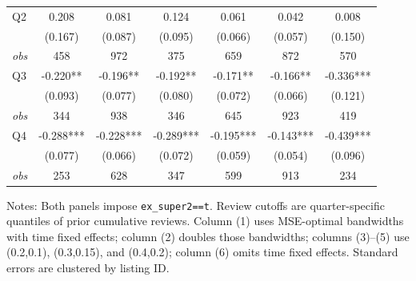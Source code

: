 \begin{table}[!htbp]
\begin{tabular}{lcccccc}
Q2 & 0.208 & 0.081 & 0.124 & 0.061 & 0.042 & 0.008 \\
 & (0.167) & (0.087) & (0.095) & (0.066) & (0.057) & (0.150) \\
\textit{obs} & 458 & 972 & 375 & 659 & 872 & 570 \\
Q3 & -0.220** & -0.196** & -0.192** & -0.171** & -0.166** & -0.336*** \\
 & (0.093) & (0.077) & (0.080) & (0.072) & (0.066) & (0.121) \\
\textit{obs} & 344 & 938 & 346 & 645 & 923 & 419 \\
Q4 & -0.288*** & -0.228*** & -0.289*** & -0.195*** & -0.143*** & -0.439*** \\
 & (0.077) & (0.066) & (0.072) & (0.059) & (0.054) & (0.096) \\
\textit{obs} & 253 & 628 & 347 & 599 & 913 & 234 \\
\bottomrule
\end{tabular}
\begin{minipage}{0.98\textwidth}\footnotesize
Notes: Both panels impose \texttt{ex\_super2==t}. Review cutoffs are quarter-specific quantiles of prior cumulative reviews. Column (1) uses MSE-optimal bandwidths with time fixed effects; column (2) doubles those bandwidths; columns (3)--(5) use (0.2,0.1), (0.3,0.15), and (0.4,0.2); column (6) omits time fixed effects. Standard errors are clustered by listing ID.
\end{minipage}
\end{table}

